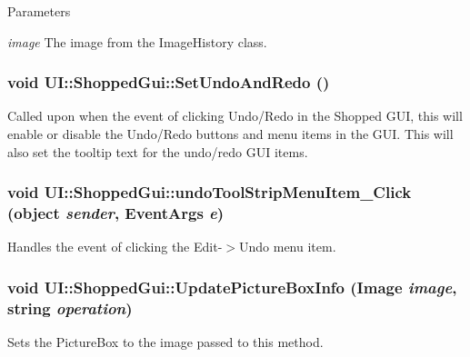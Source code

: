 \begin{DoxyParams}{Parameters}
\item[{\em image}]The image from the ImageHistory class. \end{DoxyParams}
\hypertarget{class_u_i_1_1_shopped_gui_a99e47a8b843bf190a7a0e3f8b3f5abb9}{
\subsubsection[{SetUndoAndRedo}]{\setlength{\rightskip}{0pt plus 5cm}void UI::ShoppedGui::SetUndoAndRedo ()}}
\label{class_u_i_1_1_shopped_gui_a99e47a8b843bf190a7a0e3f8b3f5abb9}
Called upon when the event of clicking Undo/Redo in the Shopped GUI, this will enable or disable the Undo/Redo buttons and menu items in the GUI. This will also set the tooltip text for the undo/redo GUI items. \hypertarget{class_u_i_1_1_shopped_gui_a167624483eae61dcbe7de755ad0549a5}{
\subsubsection[{undoToolStripMenuItem\_\-Click}]{\setlength{\rightskip}{0pt plus 5cm}void UI::ShoppedGui::undoToolStripMenuItem\_\-Click (object {\em sender}, \/  EventArgs {\em e})}}
\label{class_u_i_1_1_shopped_gui_a167624483eae61dcbe7de755ad0549a5}
Handles the event of clicking the Edit-\/$>$Undo menu item. \hypertarget{class_u_i_1_1_shopped_gui_a7e94e570fc92b635f64b1e540c2c86cd}{
\subsubsection[{UpdatePictureBoxInfo}]{\setlength{\rightskip}{0pt plus 5cm}void UI::ShoppedGui::UpdatePictureBoxInfo (Image {\em image}, \/  string {\em operation})}}
\label{class_u_i_1_1_shopped_gui_a7e94e570fc92b635f64b1e540c2c86cd}
Sets the PictureBox to the image passed to this method.


